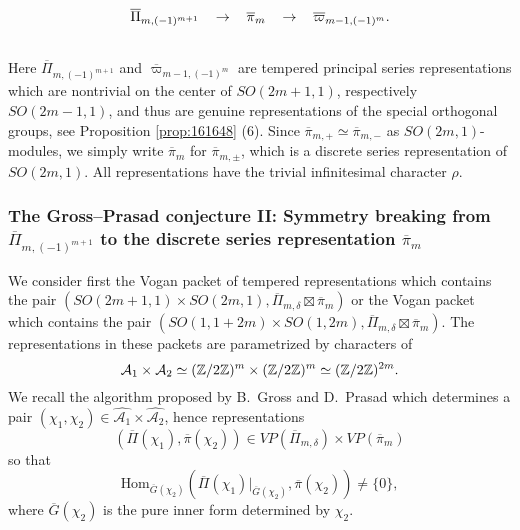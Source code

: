 \begin{equation*} 
\begin{tabular}{ccccc}
{$\overline{\Pi}_{m,(-1)^{m+1}}$}& $ \rightarrow   $   & $\overline{ \pi}_m     $      &    $   \rightarrow      $         &   {$\overline{ \varpi }_{m-1,(-1)^m}$}. \\
 &   &   &  &
\end{tabular}
\end{equation*}

Here $\overline{\Pi}_{m,(-1)^{m+1}}$ and $\overline{\varpi}_{m-1,(-1)^m}$ are tempered principal series representations
 which are nontrivial on the center of $SO(2m+1,1)$,  respectively
 $SO(2m-1,1)$, 
 and thus are genuine representations
 of the special orthogonal groups,
 see Proposition \ref{prop:161648} (6).  
Since $\overline{\pi}_{m,+} \simeq \overline{\pi}_{m,-}$ 
 as $SO(2m,1)$-modules,
 we simply write $\overline{\pi}_{m}$
 for $\overline{\pi}_{m,\pm}$, 
 which is a discrete series representation of $SO(2m,1)$. All representations have the trivial infinitesimal  character $\rho$.

\subsubsection{The Gross--Prasad conjecture II: 
Symmetry breaking from 
 $\overline{\Pi}_{m,(-1)^{m+1}}$
 to the discrete series representation $\overline \pi_m$}

We consider first the Vogan packet of tempered representations which contains the pair $(SO(2m+1,1) \times SO(2m,1), \overline{\Pi }_{m,\delta} \boxtimes \overline{\pi}_m )$ 
 or the Vogan packet which contains the pair
$(SO(1,1+2m)\times SO(1,2m), \overline{ \Pi}_{m,\delta} \boxtimes \overline{ \pi}_m )$. 
The representations in these packets are parametrized by characters of
\[
     {\mathcal{A}}_1 \times {\mathcal{A}}_2 
     \simeq 
     ({\mathbb Z}/2{\mathbb Z})^{\color{black}{m}} \times ({\mathbb Z}/2{\mathbb Z})^m \simeq ({\mathbb Z}/2{\mathbb Z})^{2m} . 
\] 
We recall the algorithm proposed  by B.~Gross and D.~Prasad 
 which determines a pair 
$
     (\chi_1, \chi_2)
 \in 
     \widehat{{\mathcal{A}}_1}\times \widehat{{\mathcal{A}}_2}
$, 
 hence representations 
\[
   (\overline{\Pi}(\chi_1),\overline{\pi}(\chi_2 )) \in VP(\overline{\Pi}_{m,\delta}) \times VP(\overline{\pi}_m)
\]
 so that 
\[ 
   \mbox{Hom}_{\overline{G}(\chi_2)}(\overline{\Pi}(\chi_1)|_{\overline G(\chi_2)},\overline{\pi}(\chi_2) ) \not = \{0\},
\]
where $\overline{G}(\chi_2) $ is the pure inner form determined by $\chi_2$.

